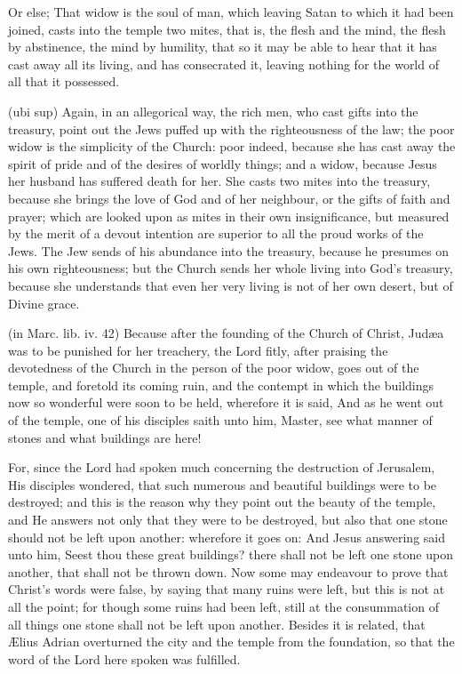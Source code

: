  Or else; That widow is the soul of man, which leaving Satan to which it had been joined, casts into the temple two mites, that is, the flesh and the mind, the flesh by abstinence, the mind by humility, that so it may be able to hear that it has cast away all its living, and has consecrated it, leaving nothing for the world of all that it possessed.

 (ubi sup) Again, in an allegorical way, the rich men, who cast gifts into the treasury, point out the Jews puffed up with the righteousness of the law; the poor widow is the simplicity of the Church: poor indeed, because she has cast away the spirit of pride and of the desires of worldly things; and a widow, because Jesus her husband has suffered death for her. She casts two mites into the treasury, because she brings the love of God and of her neighbour, or the gifts of faith and prayer; which are looked upon as mites in their own insignificance, but measured by the merit of a devout intention are superior to all the proud works of the Jews. The Jew sends of his abundance into the treasury, because he presumes on his own righteousness; but the Church sends her whole living into God’s treasury, because she understands that even her very living is not of her own desert, but of Divine grace.


 

 (in Marc. lib. iv. 42) Because after the founding of the Church of Christ, Judæa was to be punished for her treachery, the Lord fitly, after praising the devotedness of the Church in the person of the poor widow, goes out of the temple, and foretold its coming ruin, and the contempt in which the buildings now so wonderful were soon to be held, wherefore it is said, And as he went out of the temple, one of his disciples saith unto him, Master, see what manner of stones and what buildings are here!

 For, since the Lord had spoken much concerning the destruction of Jerusalem, His disciples wondered, that such numerous and beautiful buildings were to be destroyed; and this is the reason why they point out the beauty of the temple, and He answers not only that they were to be destroyed, but also that one stone should not be left upon another: wherefore it goes on: And Jesus answering said unto him, Seest thou these great buildings? there shall not be left one stone upon another, that shall not be thrown down. Now some may endeavour to prove that Christ’s words were false, by saying that many ruins were left, but this is not at all the point; for though some ruins had been left, still at the consummation of all things one stone shall not be left upon another. Besides it is related, that Ælius Adrian overturned the city and the temple from the foundation, so that the word of the Lord here spoken was fulfilled.

